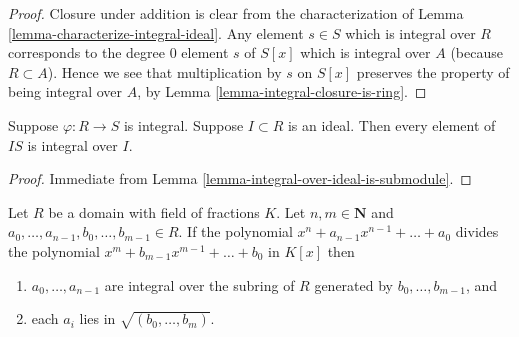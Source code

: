 \begin{proof}
Closure under addition is clear from the
characterization of Lemma \ref{lemma-characterize-integral-ideal}.
Any element $s \in S$ which is integral over
$R$ corresponds to the degree $0$ element $s$ of $S[x]$
which is integral over $A$ (because $R \subset A$). 
Hence we see that multiplication by $s$ on $S[x]$
preserves the property of being integral over $A$,
by Lemma \ref{lemma-integral-closure-is-ring}.
\end{proof}

\begin{lemma}
\label{lemma-integral-integral-over-ideal}
Suppose $\varphi : R \to S$ is integral.
Suppose $I \subset R$ is an ideal.
Then every element of $IS$ is integral over $I$.
\end{lemma}

\begin{proof}
Immediate from Lemma \ref{lemma-integral-over-ideal-is-submodule}.
\end{proof}

\begin{lemma}
\label{lemma-polynomials-divide}
Let $R$ be a domain with field of fractions $K$.
Let $n,m \in \mathbf{N}$ and $a_0,\ldots,a_{n-1},b_0,\ldots,b_{m-1} \in R$.
If the polynomial $x^n + a_{n-1}x^{n-1} + \ldots + a_0$
divides the polynomial $x^m + b_{m-1} x^{m-1} + \ldots + b_0$
in $K[x]$ then 
\begin{enumerate}
\item $a_0,\ldots,a_{n-1}$ are integral over the subring
of $R$ generated by $b_0,\ldots,b_{m-1}$, and
\item each $a_i$ lies in $\sqrt{(b_0,\ldots,b_m)}$.
\end{enumerate}
\end{lemma}

